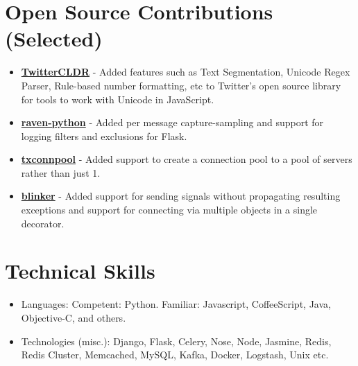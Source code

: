 \section{Open Source Contributions
(Selected)}\label{open-source-contributions-selected}

\begin{itemize}
\tightlist
\item
  \href{https://github.com/twitter/twitter-cldr-js}{\textbf{TwitterCLDR}}
  - Added features such as Text Segmentation, Unicode Regex Parser,
  Rule-based number formatting, etc to Twitter's open source library for
  tools to work with Unicode in JavaScript.
\item
  \href{https://github.com/getsentry/raven-python}{\textbf{raven-python}}
  - Added per message capture-sampling and support for logging filters
  and exclusions for Flask.
\item
  \href{https://github.com/zopim/txconnpool}{\textbf{txconnpool}} -
  Added support to create a connection pool to a pool of servers rather
  than just 1.
\item
  \href{https://github.com/zopim/blinker}{\textbf{blinker}} - Added
  support for sending signals without propagating resulting exceptions
  and support for connecting via multiple objects in a single decorator.
\end{itemize}

\section{Technical Skills}\label{technical-skills}

\begin{itemize}
\tightlist
\item
  Languages: Competent: Python. Familiar: Javascript, CoffeeScript,
  Java, Objective-C, and others.
\item
  Technologies (misc.): Django, Flask, Celery, Nose, Node, Jasmine,
  Redis, Redis Cluster, Memcached, MySQL, Kafka, Docker, Logstash, Unix
  etc.
\end{itemize}
